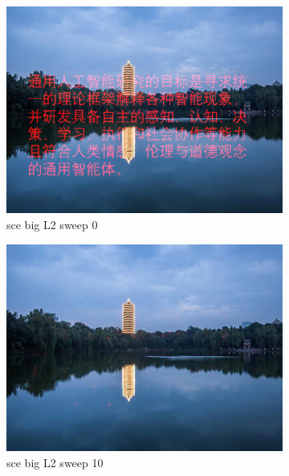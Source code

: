 \documentclass[11pt]{article}
\begin{document}
\begin{figure}[ht!]
    \centering
    \hfill%
    \begin{subfigure}[]{0.333\linewidth}
        \centering
        \includegraphics[width=\linewidth]{fig/restoration/sce_big/L2/gibbs_0.jpg}
        \caption{sce big L2 sweep 0}
    \end{subfigure}%
    \hfill%
    \begin{subfigure}[]{0.333\linewidth}
        \centering
        \includegraphics[width=\linewidth]{fig/restoration/sce_big/L2/gibbs_10.jpg}
        \caption{sce big L2 sweep 10}
    \end{subfigure}%
    \hfill%
    \begin{subfigure}[]{0.333\linewidth}

\end{subfigure}
\end{figure}
\end{document}
